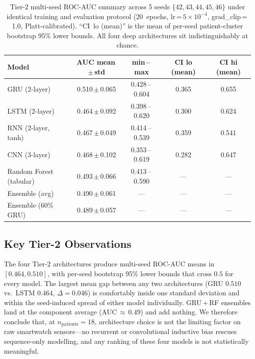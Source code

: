\documentclass[11pt,a4paper]{article}
\begin{document}
\begin{table}[H]
\centering
\caption{Tier-2 multi-seed ROC-AUC summary across 5 seeds
$\{42, 43, 44, 45, 46\}$ under identical training and evaluation protocol
(20~epochs, lr\,=\,$5\!\times\!10^{-4}$, grad\_clip\,=\,1.0,
Platt-calibrated).  ``CI~lo (mean)'' is the mean of per-seed patient-cluster
bootstrap 95\% lower bounds.  All four deep architectures sit
indistinguishably at chance.}
\label{tab:tier2_multi_seed}
\small
\begin{tabular}{lcccc}
\toprule
\textbf{Model} & \textbf{AUC mean\,$\pm$\,std} & \textbf{min\,--\,max}
  & \textbf{CI lo (mean)} & \textbf{CI hi (mean)} \\
\midrule
GRU (2-layer)            & 0.510\,$\pm$\,0.065 & 0.428\,--\,0.604 & 0.365 & 0.655 \\
LSTM (2-layer)           & 0.464\,$\pm$\,0.092 & 0.398\,--\,0.620 & 0.300 & 0.624 \\
RNN (2-layer, tanh)      & 0.467\,$\pm$\,0.049 & 0.414\,--\,0.539 & 0.359 & 0.541 \\
CNN (3-layer)            & 0.468\,$\pm$\,0.102 & 0.353\,--\,0.619 & 0.282 & 0.647 \\
\midrule
Random Forest (tabular)  & 0.493\,$\pm$\,0.066 & 0.413\,--\,0.590 & ---   & ---   \\
Ensemble (avg)           & 0.490\,$\pm$\,0.061 & ---              & ---   & ---   \\
Ensemble (60\%\,GRU)     & 0.489\,$\pm$\,0.057 & ---              & ---   & ---   \\
\bottomrule
\end{tabular}
\end{table}

\subsection{Key Tier-2 Observations}

The four Tier-2 architectures produce multi-seed ROC-AUC means in
$[0.464, 0.510]$, with per-seed bootstrap 95\% lower bounds that cross
$0.5$ for every model.  The largest mean gap between any two
architectures (GRU $0.510$ vs.\ LSTM $0.464$, $\Delta\!=\!0.046$) is
comfortably inside one standard deviation and within the seed-induced
spread of either model individually.  GRU\,+\,RF ensembles land at the
component average (AUC$\,\approx\,0.49$) and add nothing.  We therefore
conclude that, at $n_\text{patients}{=}18$, architecture choice is not
the limiting factor on raw smartwatch sensors---no recurrent or
convolutional inductive bias rescues sequence-only modelling, and any
ranking of these four models is not statistically meaningful.
\end{document}
